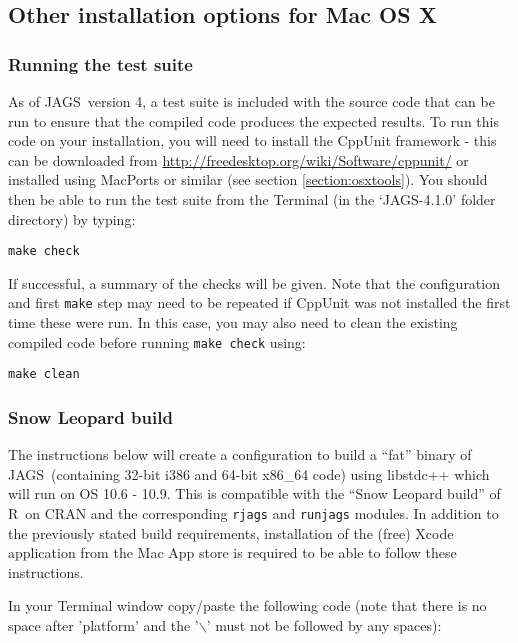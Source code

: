 \documentclass[11pt, a4paper, titlepage]{article}
\newcommand{\release}{4.1.0}
\newcommand{\JAGS}{\textsf{JAGS}}
\newcommand{\R}{\textsf{R}}
\newcommand{\file}[1]{{`\normalfont\textsf{#1}'}}
\begin{document}
\subsection{Other installation options for Mac OS X}
\label{section:otherosxoptions}

\subsubsection{Running the test suite}

As of \JAGS\ version 4, a test suite is included with the source code that can be
run to ensure that the compiled code produces the expected results.  To run
this code on your installation, you will need to install the CppUnit framework - this can
be downloaded from \url{http://freedesktop.org/wiki/Software/cppunit/} or installed using
MacPorts or similar (see section \ref{section:osxtools}).  You should then be able to 
run the test suite from the Terminal  (in the \file{JAGS-\release} folder directory) by typing:

\begin{verbatim} 
make check
\end{verbatim} 

If successful, a summary of the checks will be given.  Note that the configuration and
first \texttt{make} step may need to be repeated if CppUnit was not installed the first
time these were run.  In this case, you may also need to clean the existing 
compiled code before running \texttt{make check} using:

\begin{verbatim} 
make clean
\end{verbatim} 


\subsubsection{Snow Leopard build}

The instructions below will
create a configuration to build a ``fat'' binary of \JAGS\ (containing
32-bit i386 and 64-bit x86\_64 code) using libstdc++ which will run on
OS 10.6 - 10.9.  This is compatible with the ``Snow Leopard build'' of
\R\ on CRAN and the corresponding \texttt{rjags} and \texttt{runjags} modules. 
In addition to the previously stated build requirements, installation of 
the (free) Xcode application from the Mac App store is required to be
able to follow these instructions.

In your Terminal window copy/paste the following code (note that there is no
space after 'platform' and the '$\backslash$' must not be followed by
any spaces): 
\end{document}
